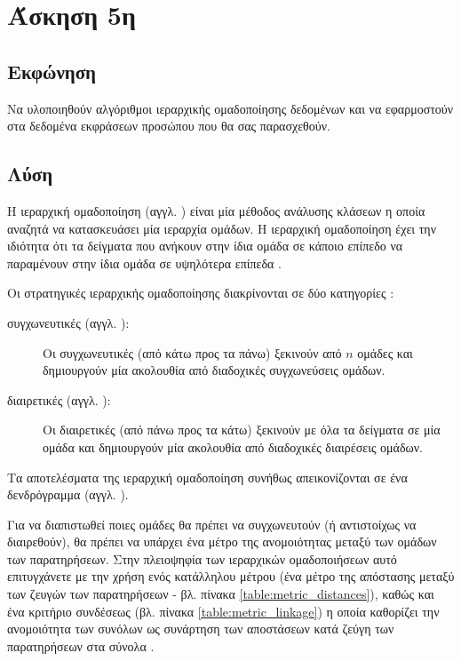 \documentclass{assignment}
\begin{document}
\section{Άσκηση 5η}
\subsection{Εκφώνηση}

Να υλοποιηθούν αλγόριθμοι ιεραρχικής ομαδοποίησης δεδομένων και να εφαρμοστούν στα δεδομένα εκφράσεων προσώπου που θα σας παρασχεθούν.

\subsection {Λύση}

Η ιεραρχική ομαδοποίηση (αγγλ. ) είναι μία μέθοδος ανάλυσης κλάσεων η οποία αναζητά να κατασκευάσει μία ιεραρχία ομάδων. Η ιεραρχική ομαδοποίηση έχει την ιδιότητα ότι τα δείγματα που ανήκουν στην ίδια ομάδα σε κάποιο επίπεδο να παραμένουν στην ίδια ομάδα σε υψηλότερα επίπεδα \cite{wiki:hierarchical_clustering, class_notes}.

Οι στρατηγικές ιεραρχικής ομαδοποίησης διακρίνονται σε δύο κατηγορίες \cite{wiki:hierarchical_clustering, class_notes}:
\begin{description}
\item[συγχωνευτικές (αγγλ. ):] Οι συγχωνευτικές (από κάτω προς τα πάνω) ξεκινούν από $n$ ομάδες και δημιουργούν μία ακολουθία από διαδοχικές συγχωνεύσεις ομάδων.
\item[διαιρετικές (αγγλ. ):]  Οι διαιρετικές (από πάνω προς τα κάτω) ξεκινούν με όλα τα δείγματα σε μία ομάδα και δημιουργούν μία ακολουθία από διαδοχικές διαιρέσεις ομάδων.
\end{description}
 
Τα αποτελέσματα της ιεραρχική ομαδοποίηση συνήθως απεικονίζονται σε ένα δενδρόγραμμα (αγγλ. ).

Για να διαπιστωθεί ποιες ομάδες θα πρέπει να συγχωνευτούν (ή αντιστοίχως να διαιρεθούν), θα πρέπει να υπάρχει ένα μέτρο της ανομοιότητας μεταξύ των ομάδων των παρατηρήσεων. Στην πλειοψηφία των ιεραρχικών ομαδοποιήσεων αυτό επιτυγχάνετε με την χρήση ενός κατάλληλου μέτρου (ένα μέτρο της απόστασης μεταξύ των ζευγών των παρατηρήσεων - βλ. πίνακα \ref{table:metric_distances}), καθώς και ένα κριτήριο συνδέσεως (βλ. πίνακα \ref{table:metric_linkage}) η οποία καθορίζει την ανομοιότητα των συνόλων ως συνάρτηση των αποστάσεων κατά ζεύγη των παρατηρήσεων στα σύνολα \cite{wiki:hierarchical_clustering}.
\end{document}
